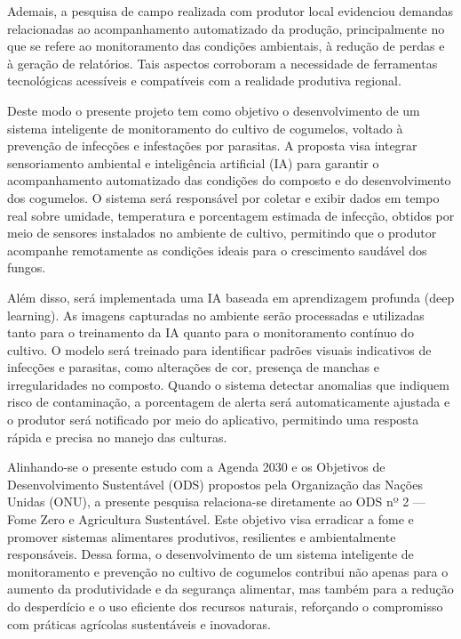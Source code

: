 Ademais, a pesquisa de campo realizada com produtor local evidenciou demandas relacionadas ao acompanhamento automatizado da produção, principalmente no que se refere ao monitoramento das condições ambientais, à redução de perdas e à geração de relatórios. Tais aspectos corroboram a necessidade de ferramentas tecnológicas acessíveis e compatíveis com a realidade produtiva regional.

Deste modo o presente projeto tem como objetivo o desenvolvimento de um sistema inteligente de monitoramento do cultivo de cogumelos, voltado à prevenção de infecções e infestações por parasitas. A proposta visa integrar sensoriamento ambiental e inteligência artificial (IA) para garantir o acompanhamento automatizado das condições do composto e do desenvolvimento dos cogumelos. O sistema será responsável por coletar e exibir dados em tempo real sobre umidade, temperatura e porcentagem estimada de infecção, obtidos por meio de sensores instalados no ambiente de cultivo, permitindo que o produtor acompanhe remotamente as condições ideais para o crescimento saudável dos fungos.

Além disso, será implementada uma IA baseada em aprendizagem profunda (deep learning). As imagens capturadas no ambiente serão processadas e utilizadas tanto para o treinamento da IA quanto para o monitoramento contínuo do cultivo. O modelo será treinado para identificar padrões visuais indicativos de infecções e parasitas, como alterações de cor, presença de manchas e irregularidades no composto. Quando o sistema detectar anomalias que indiquem risco de contaminação, a porcentagem de alerta será automaticamente ajustada e o produtor será notificado por meio do aplicativo, permitindo uma resposta rápida e precisa no manejo das culturas. 

Alinhando-se o presente estudo com a Agenda 2030 e os Objetivos de Desenvolvimento Sustentável (ODS) propostos pela Organização das Nações Unidas (ONU), a presente pesquisa relaciona-se diretamente ao ODS nº 2 — Fome Zero e Agricultura Sustentável. Este objetivo visa erradicar a fome e promover sistemas alimentares produtivos, resilientes e ambientalmente responsáveis. Dessa forma, o desenvolvimento de um sistema inteligente de monitoramento e prevenção no cultivo de cogumelos contribui não apenas para o aumento da produtividade e da segurança alimentar, mas também para a redução do desperdício e o uso eficiente dos recursos naturais, reforçando o compromisso com práticas agrícolas sustentáveis e inovadoras.

